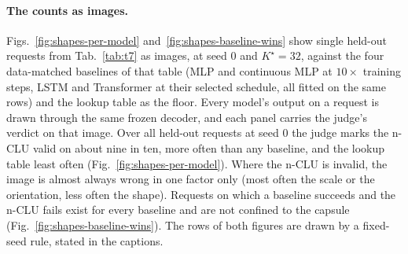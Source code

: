 \documentclass{article} %
\newcommand{\Kstar}{\ensuremath{K^{\star}}}
\begin{document}
\paragraph{The counts as images.} Figs.~\ref{fig:shapes-per-model} and~\ref{fig:shapes-baseline-wins}
show single held-out requests from Tab.~\ref{tab:t7} as images, at seed 0 and $\Kstar=32$, against the %
four data-matched baselines of that table (MLP and continuous MLP at $10\times$ training steps, LSTM and
Transformer at their selected schedule, all fitted on the same rows) and the lookup table as the %
floor. Every model's output on a request is drawn through the same frozen decoder, and each panel
carries the judge's verdict on that image. Over all held-out requests at seed 0 the judge marks %
the n-CLU valid on about nine in ten, more often than any baseline, and the lookup table %
least often (Fig.~\ref{fig:shapes-per-model}). %
Where the n-CLU is invalid, the image is almost always wrong in one factor only %
(most often the scale or the orientation, less often the shape). %
Requests on which a baseline succeeds and the n-CLU fails exist for every baseline %
and are not confined to the capsule %
(Fig.~\ref{fig:shapes-baseline-wins}). %
The rows of both figures are drawn by a fixed-seed rule, stated in the captions.
\end{document}
